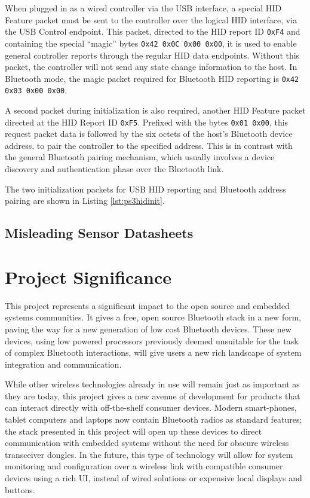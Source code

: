 When plugged in as a wired controller via the USB interface, a special HID Feature packet must be sent to the controller over the logical HID interface, via the USB Control endpoint. This packet, directed to the HID report ID \texttt{0xF4} and containing the special ``magic'' bytes \texttt{0x42 0x0C 0x00 0x00}, it is used to enable general controller reports through the regular HID data endpoints. Without this packet, the controller will not send any state change information to the host. In Bluetooth mode, the magic packet required for Bluetooth HID reporting is \texttt{0x42 0x03 0x00 0x00}.

A second packet during initialization is also required, another HID Feature packet directed at the HID Report ID \texttt{0xF5}. Prefixed with the bytes \texttt{0x01 0x00}, this request packet data is followed by the six octets of the host's Bluetooth device address, to pair the controller to the specified address. This is in contrast with the general Bluetooth pairing mechanism, which usually involves a device discovery and authentication phase over the Bluetooth link.

The two initialization packets for USB HID reporting and Bluetooth address pairing are shown in Listing \ref{lst:ps3hidinit}.



\subsection{Misleading Sensor Datasheets}


\section{Project Significance}

This project represents a significant impact to the open source and embedded systems communities. It gives a free, open source Bluetooth stack in a new form, paving the way for a new generation of low cost Bluetooth devices. These new devices, using low powered processors previously deemed unsuitable for the task of complex Bluetooth interactions, will give users a new rich landscape of system integration and communication.

While other wireless technologies already in use will remain just as important as they are today, this project gives a new avenue of development for products that can interact directly with off-the-shelf consumer devices. Modern smart-phones, tablet computers and laptops now contain Bluetooth radios as standard features; the stack presented in this project will open up these devices to direct communication with embedded systems without the need for obscure wireless transceiver dongles. In the future, this type of technology will allow for system monitoring and configuration over a wireless link with compatible consumer devices using a rich UI, instead of wired solutions or expensive local displays and buttons.